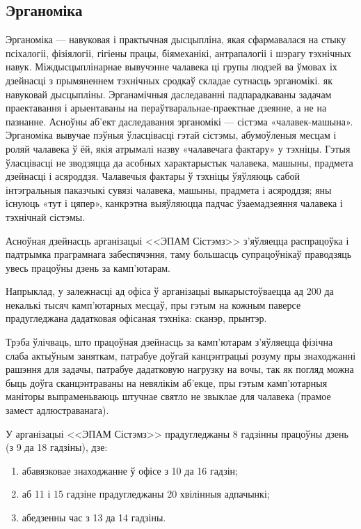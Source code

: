 \subsection{Эрганоміка}

Эрганоміка --- навуковая і практычная дысцыпліна, якая сфармавалася на стыку псіхалогіі, фізіялогіі, гігіены працы, біямеханікі, антрапалогіі і шэрагу тэхнічных навук. Міждысцыплінарнае вывучэнне чалавека ці групы людзей ва ўмовах іх дзейнасці з прымяненнем тэхнічных сродкаў складае сутнасць эрганомікі. як навуковай дысцыпліны. Эрганамічныя даследаванні падпарадкаваны задачам праектавання і арыентаваны на пераўтваральнае-праектнае дзеянне, а не на пазнанне. Асноўны аб'ект даследавання эрганомікі --- сістэма «чалавек-машына». Эрганоміка вывучае пэўныя ўласцівасці гэтай сістэмы, абумоўленыя месцам і роляй чалавека ў ёй, якія атрымалі назву «чалавечага фактару» у тэхніцы. Гэтыя ўласцівасці не зводзяцца да асобных характарыстык чалавека, машыны, прадмета дзейнасці і асяроддзя. Чалавечыя фактары ў тэхніцы ўяўляюць сабой інтэгральныя паказчыкі сувязі чалавека, машыны, прадмета і асяроддзя; яны існуюць «тут і цяпер», канкрэтна выяўляюцца падчас ўзаемадзеяння чалавека і тэхнічнай сістэмы.

Асноўная дзейнасць арганізацыі <<ЭПАМ Сістэмз>> з'яўляецца
распрацоўка і падтрымка праграмнага забеспячэння, таму большасць супрацоўнікаў
праводзяць увесь працоўны дзень за камп'ютарам.

Напрыклад, у залежнасці ад офіса ў арганізацыі выкарыстоўваецца ад
200 да некалькі тысяч камп'ютарных месцаў, пры гэтым на кожным паверсе
прадугледжана дадатковая офісаная тэхніка: сканэр, прынтэр.

Трэба ўлічваць, што працоўная дзейнасць за камп'ютарам з'яўляецца фізічна слаба актыўным заняткам, патрабуе доўгай канцэнтрацыі розуму пры знаходжанні рашэння для задачы, патрабуе дадатковую нагрузку на вочы, так як погляд можна быць доўга сканцэнтраваны на невялікім аб'екце, пры гэтым камп'ютарныя маніторы выпраменьваюць штучнае святло не звыклае для чалавека (прамое замест адлюстраванага).

У арганізацыі <<ЭПАМ Сістэмз>> прадугледжаны 8 гадзінны працоўны дзень
(з 9 да 18 гадзіны), дзе:
\begin{enumerate}
    \item абавязковае знаходжанне ў офісе з 10 да 16 гадзін;
    \item аб 11 і 15 гадзіне прадугледжаны 20 хвілінныя адпачынкі;
    \item абедзенны час з 13 да 14 гадзіны.
\end{enumerate}

